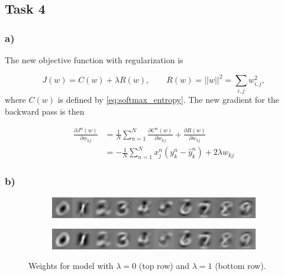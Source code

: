 \subsection*{Task 4}

\subsubsection*{a)}

The new objective function with regularization is

\begin{equation*}
  J(w) = C(w) + \lambda R(w), \quad\quad R(w) = ||w||^2 = \sum_{i,j} w_{i,j}^2,
\end{equation*}
where $C(w)$ is defined by \cref{eq:softmax_entropy}. The new gradient for the backward pass is then

\begin{align*}
  \frac{\partial J^n(w)}{\partial w_{kj}} &= \frac{1}{N} \sum_{n=1}^{N} \frac{\partial C^n(w)}{\partial w_{kj}} + \frac{\partial R(w)}{\partial w_{kj}} \\
                                          &= -\frac{1}{N} \sum_{n=1}^{N} x_j^n (y_k^n - \hat{y}_k^n) + 2 \lambda w_{kj}
\end{align*}



\subsubsection*{b)}

\begin{figure}[!h]
    \centering
    \begin{subfigure}[b]{\linewidth}
        \centering
        \includegraphics[width=\linewidth]{figures/Task4b_lambda0.pdf}
    \end{subfigure}
    \begin{subfigure}[b]{\linewidth}
        \centering
        \includegraphics[width=\linewidth]{figures/Task4b_lambda1.pdf}
    \end{subfigure}
    \caption{Weights for model with $\lambda=0$ (top row) and $\lambda=1$ (bottom row).}
    \label{fig:task4:weights}
\end{figure}

